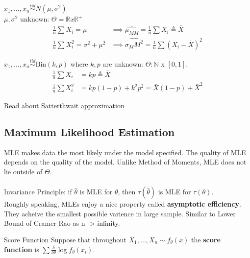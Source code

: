\documentclass[11pt,fleqn]{book} %
\begin{document}
\begin{example}
	$x_1, \dots, x_n \overset{iid}{\sim} N(\mu, \sigma^2)$\\
	$\mu, \sigma^2$ unknown: $\Theta = \mathbb{R} x \mathbb{R}^+$\\
	\begin{align*}
	\frac{1}{n} \sum X_i = \mu &\implies \hat{\mu_{MM}} = \frac{1}{n} \sum X_i \triangleq \bar{X}\\
	\frac{1}{n} \sum X_i^2 = \sigma^2 + \mu^2 &\implies \hat{\sigma_MM^2} = \frac{1}{n} \sum (X_i - \bar{X})^2
	\end{align*}
\end{example}

\begin{example}
	$x_1, \dots, x_n \overset{iid}{\sim} \text{Bin}(k,p)$ where $k, p$ are unknown: $\Theta: \mathbb{N} \text{ x } [0,1]$.\\

	\begin{align*}
	\frac{1}{n} \sum X_i &= kp \triangleq \bar{X}\\
	\frac{1}{n} \sum X_i^2 &= kp(1-p) + k^2p^2 = \bar{X}(1-p) + \bar{X}^2
	\end{align*}
\end{example}

\begin{remark}
	Read about Satterthwait approximation
\end{remark}

\subsection{Maximum Likelihood Estimation}

MLE makes data the most likely under the model specified. The quality of MLE depends on the quality of the model. Unlike Method of Moments, MLE does not lie outside of $\Theta$. \\
\\
Invariance Principle: if $\hat{\theta}$ is MLE for $\theta$, then $\tau(\hat{\theta})$ is MLE for $\tau(\theta)$. \\

Roughly speaking, MLEs enjoy a nice property called \textbf{asymptotic efficiency}. They acheive the smallest possible varience in large sample. Similar to Lower Bound of Cramer-Rao as n -> infinity. 

\begin{definition}{Score Function}
	Suppose that throughout $X_1,\dots,X_n \sim f_\theta(x)$ the \textbf{score function} is $\sum \frac{\delta}{\delta \theta} \log f_\theta(x_i)$. 
\end{definition}
\end{document}
